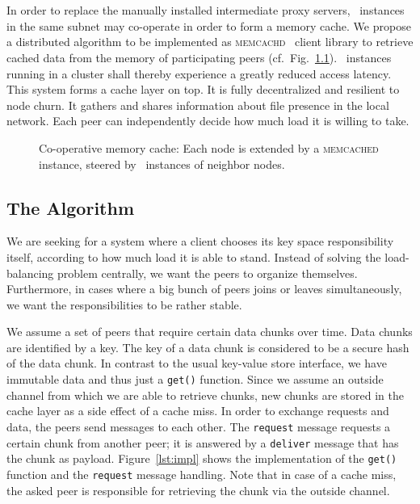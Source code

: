 \chapter{}
\label{sct:crowd}
In order to replace the manually installed intermediate proxy servers, \cvmfs\ instances in the same subnet may co-operate in order to form a memory cache.
We propose a distributed algorithm to be implemented as {\scshape memcachd}~\cite{memcached04} client library to retrieve cached data from the memory of participating peers (cf.~Fig.~\ref{fig:memcached}).
\cvmfs\ instances running in a cluster shall thereby experience a greatly reduced access latency.
This system forms a cache layer on top.
It is fully decentralized and resilient to node churn.
It gathers and shares information about file presence in the local network.
Each peer can independently decide how much load it is willing to take.

\begin{figure}
	\begin{center}
		\begin{tikzpicture}
			
			
			
		\end{tikzpicture}
	\end{center}
	\caption{Co-operative memory cache: Each node is extended by a {\scshape memcached} instance, steered by \cvmfs\ instances of neighbor nodes.}
	\label{fig:memcached}
\end{figure}

\section{The Algorithm}
We are seeking for a system where a client chooses its key space responsibility itself, according to how much load it is able to stand.
Instead of solving the load-balancing problem centrally, we want the peers to organize themselves.
Furthermore, in cases where a big bunch of peers joins or leaves simultaneously, we want the responsibilities to be rather stable.

We assume a set of peers that require certain data chunks over time.
Data chunks are identified by a key.
The key of a data chunk is considered to be a secure hash of the data chunk.
In contrast to the usual key-value store interface, we have immutable data and thus just a \texttt{get()} function.
Since we assume an outside channel from which we are able to retrieve chunks, new chunks are stored in the cache layer as a side effect of a cache miss.
In order to exchange requests and data, the peers send messages to each other.
The \texttt{request} message requests a certain chunk from another peer; it is answered by a \texttt{deliver} message that has the chunk as payload.
Figure~\ref{lst:impl} shows the implementation of the \texttt{get()} function and the \texttt{request} message handling.
Note that in case of a cache miss, the asked peer is responsible for retrieving the chunk via the outside channel.

